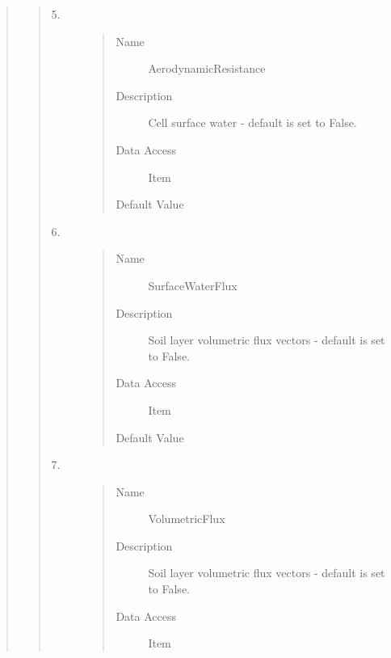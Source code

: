\documentclass[letterpaper,10pt,english]{sphinxmanual}
\begin{document}
\begin{quote}
\begin{description}
\begin{quote}
\begin{description}
\item[{5.}] \leavevmode\begin{quote}\begin{description}
\item[{Name}] \leavevmode
AerodynamicResistance

\item[{Description}] \leavevmode
Cell surface water - default is set to False.

\item[{Data Access}] \leavevmode
Item

\item[{Default Value}] \leavevmode
{}

\end{description}\end{quote}

\item[{6.}] \leavevmode\begin{quote}\begin{description}
\item[{Name}] \leavevmode
SurfaceWaterFlux

\item[{Description}] \leavevmode
Soil layer volumetric flux vectors - default is set to False.

\item[{Data Access}] \leavevmode
Item

\item[{Default Value}] \leavevmode
{}

\end{description}\end{quote}

\item[{7.}] \leavevmode\begin{quote}\begin{description}
\item[{Name}] \leavevmode
VolumetricFlux

\item[{Description}] \leavevmode
Soil layer volumetric flux vectors - default is set to False.

\item[{Data Access}] \leavevmode
Item


\end{description}
\end{quote}
\end{description}
\end{quote}
\end{description}
\end{quote}
\end{document}
